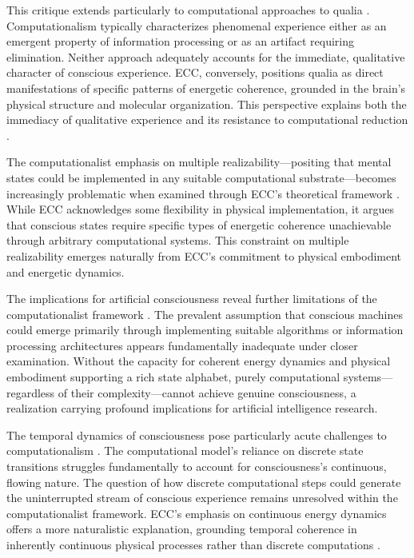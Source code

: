 \begin{refsection}
This critique extends particularly to computational approaches to qualia \cite{searle1980minds}. Computationalism typically characterizes phenomenal experience either as an emergent property of information processing or as an artifact requiring elimination. Neither approach adequately accounts for the immediate, qualitative character of conscious experience. ECC, conversely, positions qualia as direct manifestations of specific patterns of energetic coherence, grounded in the brain's physical structure and molecular organization. This perspective explains both the immediacy of qualitative experience and its resistance to computational reduction \cite{smith2019promise}.

The computationalist emphasis on multiple realizability—positing that mental states could be implemented in any suitable computational substrate—becomes increasingly problematic when examined through ECC's theoretical framework \cite{maturana1980autopoiesis}. While ECC acknowledges some flexibility in physical implementation, it argues that conscious states require specific types of energetic coherence unachievable through arbitrary computational systems. This constraint on multiple realizability emerges naturally from ECC's commitment to physical embodiment and energetic dynamics.

The implications for artificial consciousness reveal further limitations of the computationalist framework \cite{van1998dynamical}. The prevalent assumption that conscious machines could emerge primarily through implementing suitable algorithms or information processing architectures appears fundamentally inadequate under closer examination. Without the capacity for coherent energy dynamics and physical embodiment supporting a rich state alphabet, purely computational systems—regardless of their complexity—cannot achieve genuine consciousness, a realization carrying profound implications for artificial intelligence research.

The temporal dynamics of consciousness pose particularly acute challenges to computationalism \cite{van1998dynamical}. The computational model's reliance on discrete state transitions struggles fundamentally to account for consciousness's continuous, flowing nature. The question of how discrete computational steps could generate the uninterrupted stream of conscious experience remains unresolved within the computationalist framework. ECC's emphasis on continuous energy dynamics offers a more naturalistic explanation, grounding temporal coherence in inherently continuous physical processes rather than discrete computations \cite{wheeler2005reconstructing}.


\end{refsection}

